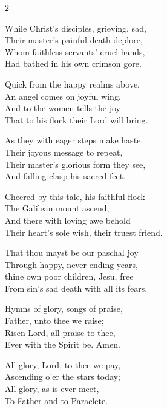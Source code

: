 \begin{multicols}{2}
\begin{enpars}
While Christ's disciples, grieving, sad,\\
Their master's painful death deplore,\\
Whom faithless servants' cruel hands,\\
Had bathed in his own crimson gore.

Quick from the happy realms above,\\
An angel comes on joyful wing,\\
And to the women tells the joy\\
That to his flock their Lord will bring.

As they with eager steps make haste,\\
Their joyous message to repeat,\\
Their master's glorious form they see,\\
And falling clasp his sacred feet.

Cheered by this tale, his faithful flock\\
The Galilean mount ascend,\\
And there with loving awe behold\\
Their heart's sole wish, their truest friend.

That thou mayst be our paschal joy\\
Through happy, never-ending years,\\
thine own poor children, Jesu, free\\
From sin's sad death with all its fears.

Hymns of glory, songs of praise,\\
Father, unto thee we raise;\\
Risen Lord, all praise to thee,\\
Ever with the Spirit be. Amen.


All glory, Lord, to thee we pay,\\
Ascending o’er the stars today;\\
All glory, as is ever meet,\\
To Father and to Paraclete.
\end{enpars}
\end{multicols}
